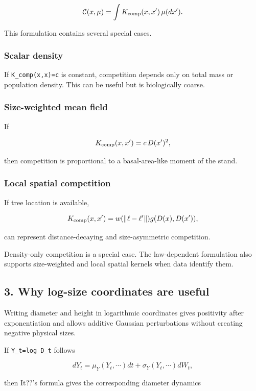 \[
\mathcal C(x,\mu)=\int K_{\rm comp}(x,x')\,\mu(dx').
\]

This formulation contains several special cases.

\subsubsection{Scalar density}\label{scalar-density}

If \texttt{K\_comp(x,x\textquotesingle{})=c} is constant, competition depends only on total mass or
population density. This can be useful but is biologically coarse.

\subsubsection{Size-weighted mean field}\label{size-weighted-mean-field}

If

\[
K_{\rm comp}(x,x')=c\,D(x')^2,
\]

then competition is proportional to a basal-area-like moment of the stand.

\subsubsection{Local spatial competition}\label{local-spatial-competition}

If tree location is available,

\[
K_{\rm comp}(x,x')=w(\|\ell-\ell'\|)g(D(x),D(x')),
\]

can represent distance-decaying and size-asymmetric competition.

Density-only competition is a special case. The law-dependent formulation also
supports size-weighted and local spatial kernels when data identify them.

\subsection{3. Why log-size coordinates are useful}\label{why-log-size-coordinates-are-useful}

Writing diameter and height in logarithmic coordinates gives positivity after
exponentiation and allows additive Gaussian perturbations without creating
negative physical sizes.

If \texttt{Y\_t=log\ D\_t} follows

\[
dY_t=\mu_Y(Y_t,\cdots)dt+\sigma_Y(Y_t,\cdots)dW_t,
\]

then It??'s formula gives the corresponding diameter dynamics

